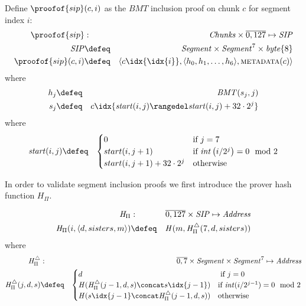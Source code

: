 \begin{definition}
\label{def:sip}
Define  $\proofof{sip}(c,i)$ as the $\mathit{BMT}$ inclusion proof on chunk $c$ for segment index $i$:
%
\begin{eqnarray}
\proofof{sip}&: &\mathit{Chunks}\times \overline{0,127} \mapsto \mathit{SIP}\\
\mathit{SIP}&\defeq&\mathit{Segment}\times\mathit{Segment}^7\times \mathit{byte}\{8\}
\\
\proofof{sip}(c,i) &\defeq &\langle c\idx{\idx{i}},\langle h_0, h_1, \ldots, h_6\rangle, \textsc{metadata}(c)\rangle  
\end{eqnarray}
%
where
%
\begin{eqnarray}
h_j&\defeq& \mathit{BMT}(s_j,j)\\
s_j&\defeq&c\idx{\mathit{start}(i,j)\rangedel\mathit{start}(i,j)+32\cdot 2^j}
\end{eqnarray}
%
where
%
\begin{eqnarray}
\mathit{start}(i,j)&\defeq&
\begin{cases}
0 &\text{if } j=7\\
start(i,j+1) & \text{if } \mathit{int}\left(i / 2^j\right) = 0 \mod 2\\
start(i,j+1)+32\cdot 2^{j} &\text{otherwise}
\end{cases}
\end{eqnarray}
\end{definition}

In order to validate segment inclusion proofs we first introduce the prover hash function $\mathit{H}_{\Pi}$.

\begin{definition}
\label{def:prover-function}
%
\begin{eqnarray}
\mathit{H}_{\Pi}&:&\overline{0,127}\times\mathit{SIP}\mapsto\mathit{Address}\\
\mathit{H}_{\Pi}(i,\langle d, sisters, m\rangle)&\defeq&\mathit{H}(m,\mathit{H}_{\Pi}^{\triangle}(7,d,sisters))
\end{eqnarray}
%
where
%
\begin{eqnarray}
\mathit{H}_{\Pi}^{\triangle}&:&\overline{0,7}\times\mathit{Segment}\times\mathit{Segment}^7\mapsto\mathit{Address}\\
\mathit{H}_{\Pi}^{\triangle}(j,d,s)&\defeq& \begin{cases}
d & \text{ if } j=0\\
\mathit{H}(\mathit{H}_{\Pi}^{\triangle}(j-1,d,s)\concat s\idx{j-1}) & \text{if }\mathit{int}(i/2^{j-1}) = 0 \mod 2\\
\mathit{H}(s\idx{j-1}\concat \mathit{H}_{\Pi}^{\triangle}(j-1,d,s)) &\text{otherwise}
\end{cases}
\end{eqnarray}
\end{definition}



